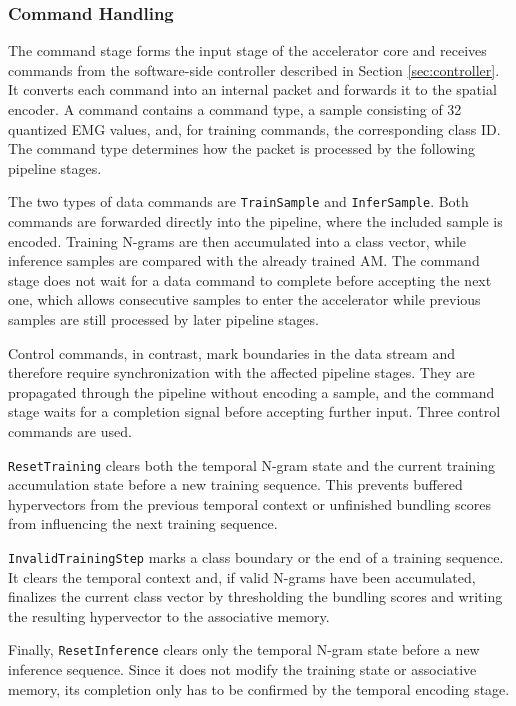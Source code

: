     \subsubsection{Command Handling}
    The command stage forms the input stage of the accelerator core and receives commands from the software-side controller described in Section \ref{sec:controller}. It converts each command into an internal packet and forwards it to the spatial encoder. A command contains a command type, a sample consisting of 32 quantized EMG values, and, for training commands, the corresponding class ID. The command type determines how the packet is processed by the following pipeline stages. 
    
    The two types of data commands are \texttt{TrainSample} and \texttt{InferSample}. Both commands are forwarded directly into the pipeline, where the included sample is encoded. Training N-grams are then accumulated into a class vector, while inference samples are compared with the already trained \ac{AM}. The command stage does not wait for a data command to complete before accepting the next one, which allows consecutive samples to enter the accelerator while previous samples are still processed by later pipeline stages. 
    
    Control commands, in contrast, mark boundaries in the data stream and therefore require synchronization with the affected pipeline stages. They are propagated through the pipeline without encoding a sample, and the command stage waits for a completion signal before accepting further input. Three control commands are used. 

    \texttt{ResetTraining} clears both the temporal N-gram state and the current training accumulation state before a new training sequence. This prevents buffered hypervectors from the previous temporal context or unfinished bundling scores from influencing the next training sequence.

    \texttt{InvalidTrainingStep} marks a class boundary or the end of a training sequence. It clears the temporal context and, if valid N-grams have been accumulated, finalizes the current class vector by thresholding the bundling scores and writing the resulting hypervector to the associative memory.

    Finally, \texttt{ResetInference} clears only the temporal N-gram state before a new inference sequence. Since it does not modify the training state or associative memory, its completion only has to be confirmed by the temporal encoding stage.


